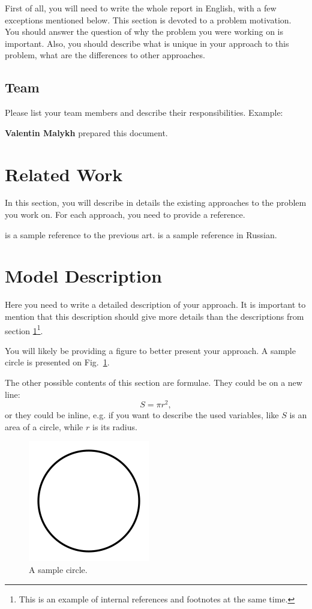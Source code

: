 \documentclass{article}
\begin{document}
First of all, you will need to write the whole report in English, with a few exceptions mentioned below.
This section is devoted to a problem motivation. You should answer the question of why the problem you were working on is important. Also, you should describe what is unique in your approach to this problem, what are the differences to other approaches.
\subsection{Team}
Please list your team members and describe their responsibilities. Example:

\textbf{Valentin Malykh} prepared this document.



\section{Related Work}
\label{sec:related}
In this section, you will describe in details the existing approaches to the problem you work on. For each approach, you need to provide a reference. 

\cite{levenshtein1966binary} is a sample reference to the previous art. \cite{levenshtein1966dvoichnie} is a sample reference in Russian.

\section{Model Description}
Here you need to write a detailed description of your approach. It is important to mention that this description should give more details than the descriptions from section \ref{sec:related}\footnote{This is an example of internal references and footnotes at the same time.}. 

You will likely be providing a figure to better present your approach. A sample circle is presented on Fig.~\ref{fig:circle}.

The other possible contents of this section are formulae. They could be on a new line:
$$S=\pi r^2,$$
or they could be inline, e.g. if you want to describe the used variables, like $S$ is an area of a circle, while $r$ is its radius. 

\begin{figure}[!tbh]
    \centering
    \includegraphics[width=0.3\linewidth]{circle.png}
    \caption{A sample circle.}
    \label{fig:circle}
\end{figure}
\end{document}
